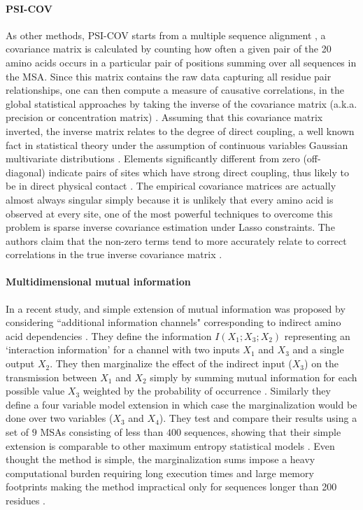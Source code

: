 \paragraph{PSI-COV}
As other methods, PSI-COV starts from a multiple sequence alignment \cite{jones2012psicov}, a covariance matrix is calculated by counting how often a given pair of the 20 amino acids occurs in a particular pair of positions summing over all sequences in the MSA. 
Since this matrix contains the raw data capturing all residue pair relationships, one can then compute a measure of causative correlations, in the global statistical approaches by taking the inverse of the covariance matrix (a.k.a. precision or concentration matrix) \cite{jones2012psicov, marks2012protein}.
Assuming that this covariance matrix inverted, the inverse matrix relates to the degree of direct coupling, a well known fact in statistical theory under the assumption of continuous variables Gaussian multivariate distributions \cite{marks2012protein}.
Elements significantly different from zero (off-diagonal) indicate pairs of sites which have strong direct coupling, thus likely to be in direct physical contact \cite{jones2012psicov}.
The empirical covariance matrices are actually almost always singular simply because it is unlikely that every amino acid is observed at every site, one of the most powerful techniques to overcome this problem is sparse inverse covariance estimation under Lasso constraints.
The authors claim that the non-zero terms tend to more accurately relate to correct correlations in the true inverse covariance matrix \cite{jones2012psicov}.

\paragraph{Multidimensional mutual information}
In a recent study, and simple extension of mutual information was proposed by considering ``additional information channels" corresponding to indirect
amino acid dependencies \cite{clark2014multidimensional}.
They define the information $I(X_1 ; X_3 ; X_2)$ representing an `interaction information' for a channel with two inputs $X_1$ and $X_3$ and a single output $X_2$.
They then marginalize the effect of the indirect input ($X_3$) on the transmission between $X_1$ and $X_2$ simply by summing mutual information for each possible value $X_3$ weighted by the probability of occurrence \cite{clark2014multidimensional}.
Similarly they define a four variable model extension in which case the marginalization would be done over two variables ($X_3$ and $X_4$).
They test and compare their results using a set of $9$ MSAs consisting of less than $400$ sequences, showing that their simple extension is comparable to other maximum entropy statistical models \cite{clark2014multidimensional}.
Even thought the method is simple, the marginalization sums impose a heavy computational burden requiring long execution times and large memory footprints making the method impractical only for sequences longer than 200 residues \cite{clark2014multidimensional}.

